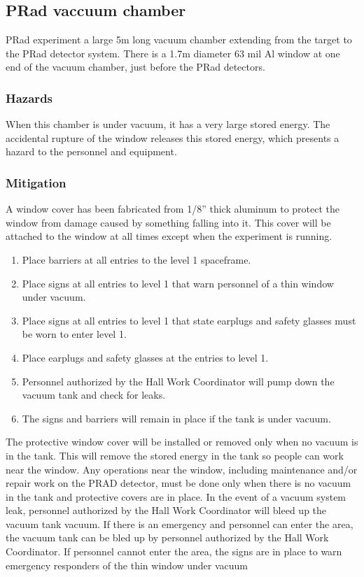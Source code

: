 \subsection{PRad vaccuum chamber}
PRad experiment a large 5m long vacuum chamber extending from the target to the PRad detector system. 
There is a 1.7m diameter 63 mil Al window at one end of the vacuum chamber, just before the PRad detectors. 

\subsubsection{Hazards}
When this chamber is under vacuum, it has a very large stored energy. 
The accidental rupture of the window releases this stored energy, which presents a hazard to the personnel and equipment.

\subsubsection{Mitigation}

A window cover has been fabricated from 1/8” thick aluminum to protect the window from damage caused by something falling into it. This cover will be attached to the window at all times except when the experiment is running.  
\begin{enumerate}
\item Place barriers at all entries to the level 1 spaceframe.
\item Place signs at all entries to level 1 that warn personnel of a thin window under vacuum.
\item Place signs at all entries to level 1 that state earplugs and safety glasses must be worn to enter level 1.
\item Place earplugs and safety glasses at the entries to level 1.
\item Personnel authorized by the Hall Work Coordinator will pump down the vacuum tank and check for leaks.
\item The signs and barriers will remain in place if the tank is under vacuum.
\end{enumerate}

The protective window cover will be installed or removed only when no vacuum is in the tank.  This will remove the stored energy in the tank so people can work near the window.  
Any operations near the window, including maintenance and/or repair work on the PRAD detector, must be done only when there is no vacuum in the tank and protective covers are in place.
In the event of a vacuum system leak, personnel authorized by the Hall Work Coordinator will bleed up the vacuum tank vacuum.
If there is an emergency and personnel can enter the area, the vacuum tank can be bled up by personnel authorized by the Hall Work Coordinator.  If personnel cannot enter the area, the signs are in place to warn emergency responders of the thin window under vacuum

